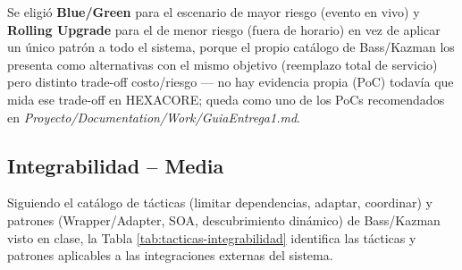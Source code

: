 \documentclass[12pt,a4paper]{article}
\begin{document}
Se eligió \textbf{Blue/Green} para el escenario de mayor riesgo (evento en vivo) y \textbf{Rolling
Upgrade} para el de menor riesgo (fuera de horario) en vez de aplicar un único patrón a todo el
sistema, porque el propio catálogo de Bass/Kazman los presenta como alternativas con el mismo
objetivo (reemplazo total de servicio) pero distinto trade-off costo/riesgo — no hay evidencia
propia (PoC) todavía que mida ese trade-off en HEXACORE; queda como uno de los PoCs recomendados en
\textit{Proyecto/Documentation/Work/GuiaEntrega1.md}.

\subsection{Integrabilidad -- Media}

Siguiendo el catálogo de tácticas (limitar dependencias, adaptar, coordinar) y patrones
(Wrapper/Adapter, SOA, descubrimiento dinámico) de Bass/Kazman visto en clase, la Tabla
\ref{tab:tacticas-integrabilidad} identifica las tácticas y patrones aplicables a las integraciones
externas del sistema.
\end{document}
